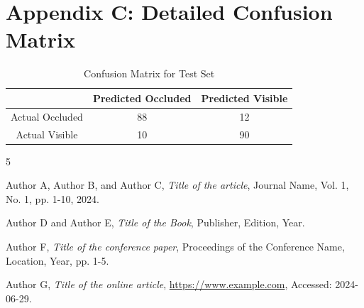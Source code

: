 \documentclass[12pt,a4paper]{report}
\theoremstyle{definition}
\theoremstyle{remark}
\begin{document}
\chapter{Appendix C: Detailed Confusion Matrix}
\label{appendix:metrics}

\begin{table}[h]
\centering
\caption{Confusion Matrix for Test Set}
\begin{tabular}{|c|c|c|}
\hline
                & Predicted Occluded & Predicted Visible \\
\hline
Actual Occluded & 88                 & 12                 \\
Actual Visible  & 10                 & 90                 \\
\hline
\end{tabular}
\end{table}



\begin{thebibliography}{5}

Author A, Author B, and Author C,
\emph{Title of the article},
Journal Name, Vol. 1, No. 1, pp. 1-10, 2024.

Author D and Author E,
\emph{Title of the Book},
Publisher, Edition, Year.

Author F,
\emph{Title of the conference paper},
Proceedings of the Conference Name, Location, Year, pp. 1-5.

Author G,
\emph{Title of the online article},
\url{https://www.example.com}, Accessed: 2024-06-29.

\end{thebibliography}
\end{document}
